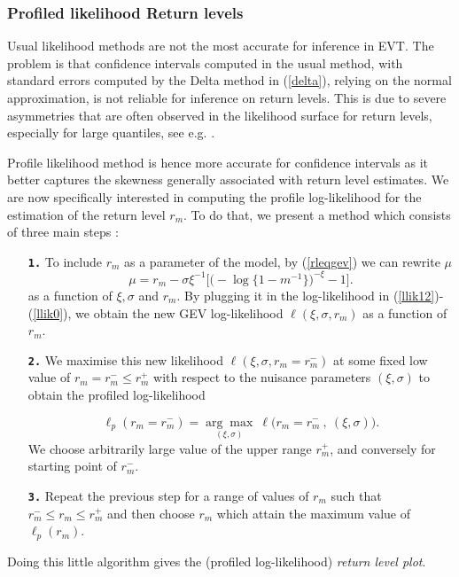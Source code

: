 \subsubsection*{Profiled likelihood Return levels}

Usual likelihood methods are not the most accurate for inference in EVT. The problem is that confidence intervals computed in the usual method, with standard 
errors computed by the Delta method in (\ref{delta}), relying on the normal approximation, is not reliable for inference on return levels.
 This is due to severe asymmetries that are often observed in the likelihood surface for return levels, especially for large quantiles, see e.g. \cite{bolivar_profile_2010}.

Profile likelihood method is hence more accurate for confidence intervals as it better captures the skewness generally associated with return level estimates.
 We are now specifically interested in computing the profile log-likelihood for the estimation of the return level $r_m$. To do that, we present a method which consists of three main steps :

\begin{enumerate}[label=\textbf{\arabic*})]
	
	\item[\textbf{\texttt{1.}}]  To include $r_m$ as a parameter of the model, by (\ref{rleqgev}) we can rewrite $\mu$ 
	\begin{equation*}
	\mu= r_m-\sigma\xi^{-1}\Big[\Big(-\log\{1-m^{-1}\}\Big)^{-\xi}-1\Big].
	\end{equation*}
	as a function of $\xi,\sigma$ and $r_m$.	By plugging it in the log-likelihood in (\ref{llik12})-(\ref{llik0}), we obtain the new GEV log-likelihood $\ell(\xi,\sigma,r_m)$ as a function of $r_m$.
	
	\item[\textbf{\texttt{2.}}]   We maximise this new likelihood $\ell (\xi,\sigma,r_m=r^{-}_{m})$ at some fixed low value of $r_m=r^{-}_{m}\leq r^{+}_{m}$ with respect to the nuisance parameters $(\xi,\sigma)$ to obtain the profiled log-likelihood
	
	\begin{equation*}
	\ell_p(r_m=r^{-}_{m})=\underset{(\xi,\sigma)}{\mathrm{\arg\max}}\ \ell \Big(r_m=r^{-}_{m}\ ,\ (\xi,\sigma)\Big).
	\end{equation*} 
	We choose arbitrarily large value of the upper range $r^{+}_m$, and conversely for starting point of $r^{-}_m$.
	
	\item[\textbf{\texttt{3.}}]  Repeat the previous step for a range of values of $r_m$ such that $r^{-}_{m}\leq r_m\leq r^{+}_{m}$ and then choose $r_m$ which attain the maximum value of $\ell_p(r_m)$.
\end{enumerate}
Doing this little algorithm gives the (profiled log-likelihood) \emph{return level plot}. 

